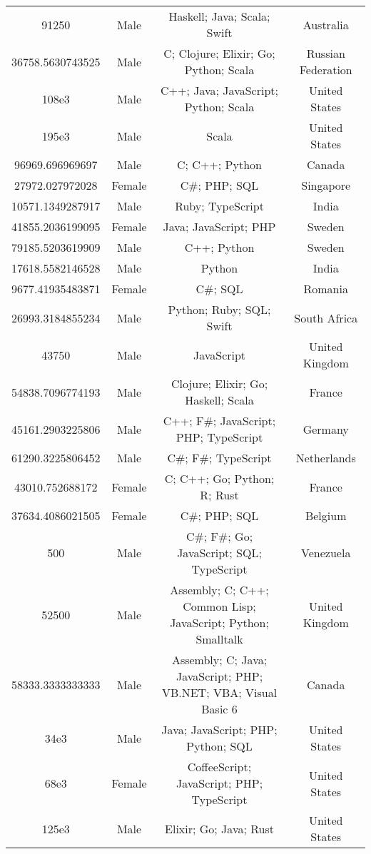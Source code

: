 \begin{center}
\begin{tabular}{ |c|c|c|c| }
91250  &  Male  &  Haskell; Java; Scala; Swift  &  Australia  \\ 
36758.5630743525  &  Male  &  C; Clojure; Elixir; Go; Python; Scala  &  Russian Federation  \\ 
108e3  &  Male  &  C++; Java; JavaScript; Python; Scala  &  United States  \\ 
195e3  &  Male  &  Scala  &  United States  \\ 
96969.696969697  &  Male  &  C; C++; Python  &  Canada  \\ 
27972.027972028  &  Female  &  C\#; PHP; SQL  &  Singapore  \\ 
10571.1349287917  &  Male  &  Ruby; TypeScript  &  India  \\ 
41855.2036199095  &  Female  &  Java; JavaScript; PHP  &  Sweden  \\ 
79185.5203619909  &  Male  &  C++; Python  &  Sweden  \\ 
17618.5582146528  &  Male  &  Python  &  India  \\ 
9677.41935483871  &  Female  &  C\#; SQL  &  Romania  \\ 
26993.3184855234  &  Male  &  Python; Ruby; SQL; Swift  &  South Africa  \\ 
43750  &  Male  &  JavaScript  &  United Kingdom  \\ 
54838.7096774193  &  Male  &  Clojure; Elixir; Go; Haskell; Scala  &  France  \\ 
45161.2903225806  &  Male  &  C++; F\#; JavaScript; PHP; TypeScript  &  Germany  \\ 
61290.3225806452  &  Male  &  C\#; F\#; TypeScript  &  Netherlands  \\ 
43010.752688172  &  Female  &  C; C++; Go; Python; R; Rust  &  France  \\ 
37634.4086021505  &  Female  &  C\#; PHP; SQL  &  Belgium  \\ 
500  &  Male  &  C\#; F\#; Go; JavaScript; SQL; TypeScript  &  Venezuela  \\ 
52500  &  Male  &  Assembly; C; C++; Common Lisp; JavaScript; Python; Smalltalk  &  United Kingdom  \\ 
58333.3333333333  &  Male  &  Assembly; C; Java; JavaScript; PHP; VB.NET; VBA; Visual Basic 6  &  Canada  \\ 
34e3  &  Male  &  Java; JavaScript; PHP; Python; SQL  &  United States  \\ 
68e3  &  Female  &  CoffeeScript; JavaScript; PHP; TypeScript  &  United States  \\ 
125e3  &  Male  &  Elixir; Go; Java; Rust  &  United States  \\ 

\end{tabular}
\end{center}
